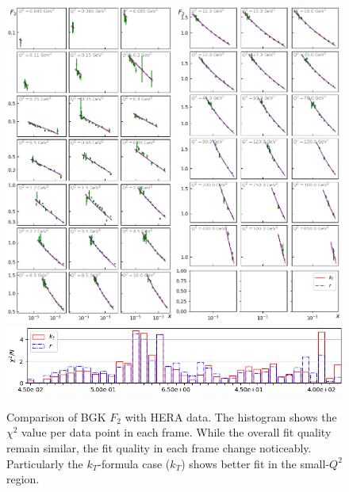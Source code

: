 \documentclass[11pt]{article}
\numberwithin{equation}{section}
\numberwithin{table}{section}
\numberwithin{figure}{section}
\begin{document}
\begin{figure}[p]
\includegraphics[width=0.49\textwidth]{./plots/Figure_2-1.png}
\includegraphics[width=0.49\textwidth]{./plots/Figure_2-2.png}
\includegraphics[width=\textwidth]{./plots/Figure_2-3.png}
\caption{Comparison of BGK $F_2$ with HERA data. The histogram shows the $\chi^2$ value per data point in each frame. While the overall fit quality remain similar, the fit quality in each frame change noticeably. Particularly the $k_T$-formula case ($k_T$) shows better fit in the small-$Q^2$ region.}
\label{fig:BGK-Grid}
\end{figure}
\end{document}

